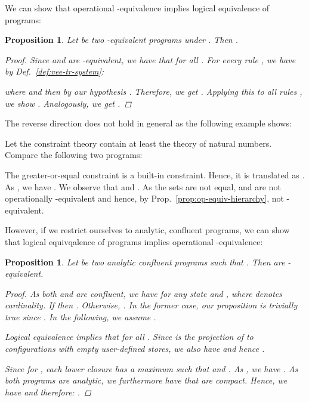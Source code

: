 \documentclass[acmtocl]{acmtrans2m}
\newtheorem{proposition}[theorem]{Proposition}
\begin{document}
We can show that operational -equivalence implies logical equivalence of
programs:

\begin{proposition}\label{prop:ll-equiv-impl-confl}Let  be two
-equivalent  programs under . Then
.
\begin{proof}
Since  and  are -equivalent, we have that
 for all .
For every rule , we have by Def.~\ref{def:vee-tr-system}:

where
 and then by our hypothesis .
Therefore, we get . Applying this to all
rules , we show .
Analogously, we get .
\end{proof}
\end{proposition}

The reverse direction does not hold in general as the following example shows:

\begin{example}
Let the constraint theory  contain at least the theory of natural numbers.
Compare the following two programs:

The greater-or-equal constraint  is a built-in constraint. Hence, it is
translated as . As , we have
.
We observe that  and
. As the
sets are not equal,  and  are not operationally -equivalent
and hence, by Prop.~\ref{prop:op-equiv-hierarchy}, not -equivalent.
\end{example}

However, if we restrict ourselves to analytic, confluent
programs, we can show that logical equivqalence of programs implies operational
-equivalence:

\begin{proposition}\label{prop:confl-impl-ll-equiv} Let  be two
analytic confluent  programs such that
.
Then  are -equivalent.
\begin{proof}
As both  and  are confluent, we have
 for any state  and ,
where  denotes cardinality. If 
then . Otherwise,
. In the former case, our
proposition is trivially true since . In the
following, we assume .

Logical equivalence implies that 
for all . Since  is the projection of  to configurations with
empty user-defined stores, we also have
 and hence
.

Since  for , each lower
closure  has a maximum
 such that  and
. As
,
we have . As both programs are analytic, we furthermore
have that  are compact. Hence, we have  and therefore: .
\end{proof}
\end{proposition}
\end{document}
